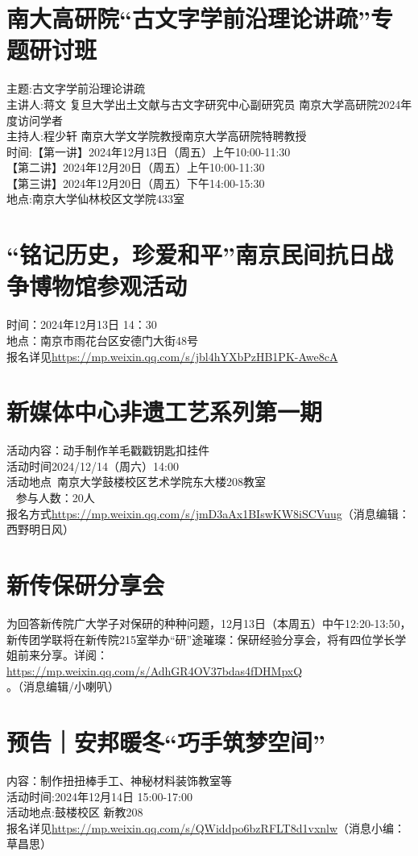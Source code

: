 \documentclass[letterpaper, 12pt]{article}
\begin{document}
\begin{multicols}{2}
\section{南大高研院“古文字学前沿理论讲疏”专题研讨班}
主题:古文字学前沿理论讲疏\\
主讲人:蒋文 复旦大学出土文献与古文字研究中心副研究员 南京大学高研院2024年度访问学者\\
主持人:程少轩 南京大学文学院教授南京大学高研院特聘教授\\
时间:【第一讲】2024年12月13日（周五）上午10:00-11:30\\
【第二讲】2024年12月20日（周五）上午10:00-11:30\\
【第三讲】2024年12月20日（周五）下午14:00-15:30\\
地点:南京大学仙林校区文学院433室\\

\section{“铭记历史，珍爱和平”南京民间抗日战争博物馆参观活动}
时间：2024年12月13日 14：30\\
地点：南京市雨花台区安德门大街48号\\
报名详见\url{https://mp.weixin.qq.com/s/jbl4hYXbPzHB1PK-Awe8cA}\\

\section{新媒体中心非遗工艺系列第一期}
活动内容：动手制作羊毛戳戳钥匙扣挂件\\
活动时间2024/12/14（周六）14:00 \\
活动地点 南京大学鼓楼校区艺术学院东大楼208教室\\ 
参与人数：20人\\
报名方式\url{https://mp.weixin.qq.com/s/jmD3aAx1BIswKW8iSCVuug}（消息编辑：西野明日风）\\

\section{新传保研分享会}
为回答新传院广大学子对保研的种种问题，12月13日（本周五）中午12:20-13:50，新传团学联将在新传院215室举办“研”途璀璨：保研经验分享会，将有四位学长学姐前来分享。详阅：\url{https://mp.weixin.qq.com/s/AdhGR4OV37bdas4fDHMpxQ}。（消息编辑/小喇叭）

\section{预告｜安邦暖冬“巧手筑梦空间”}
内容：制作扭扭棒手工、神秘材料装饰教室等\\
活动时间:2024年12月14日 15:00-17:00\\
活动地点:鼓楼校区 新教208\\
报名详见\url{https://mp.weixin.qq.com/s/QWiddpo6bzRFLT8d1vxnlw}（消息小编：草昌思）

\end{multicols} 
\end{document}
